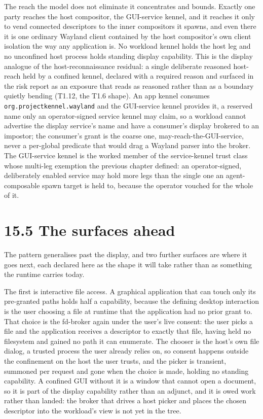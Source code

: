 The reach the model does not eliminate it concentrates and bounds.
Exactly one party reaches the host compositor, the GUI-service kennel,
and it reaches it only to vend connected descriptors to the inner
compositors it spawns, and even there it is one ordinary Wayland client
contained by the host compositor's own client isolation the way any
application is. No workload kennel holds the host leg and no unconfined
host process holds standing display capability. This is the display
analogue of the host-reconnaissance residual: a single deliberate
reasoned host-reach held by a confined kennel, declared with a required
reason and surfaced in the risk report as an exposure that reads as
reasoned rather than as a boundary quietly bending (T1.12, the T1.6
shape). An app kennel consumes \texttt{org.projectkennel.wayland} and
the GUI-service kennel provides it, a reserved name only an
operator-signed service kennel may claim, so a workload cannot advertise
the display service's name and have a consumer's display brokered to an
impostor; the consumer's grant is the coarse one,
may-reach-the-GUI-service, never a per-global predicate that would drag
a Wayland parser into the broker. The GUI-service kennel is the worked
member of the service-kennel trust class whose multi-leg exemption the
previous chapter defined: an operator-signed, deliberately enabled
service may hold more legs than the single one an agent-composable spawn
target is held to, because the operator vouched for the whole of it.

\hypertarget{the-surfaces-ahead}{%
\section{15.5 The surfaces ahead}\label{the-surfaces-ahead}}

The pattern generalises past the display, and two further surfaces are
where it goes next, each declared here as the shape it will take rather
than as something the runtime carries today.

The first is interactive file access. A graphical application that can
touch only its pre-granted paths holds half a capability, because the
defining desktop interaction is the user choosing a file at runtime that
the application had no prior grant to. That choice is the fd-broker
again under the user's live consent: the user picks a file and the
application receives a descriptor to exactly that file, having held no
filesystem and gained no path it can enumerate. The chooser is the
host's own file dialog, a trusted process the user already relies on, so
consent happens outside the confinement on the host the user trusts, and
the picker is transient, summoned per request and gone when the choice
is made, holding no standing capability. A confined GUI without it is a
window that cannot open a document, so it is part of the display
capability rather than an adjunct, and it is owed work rather than
landed: the broker that drives a host picker and places the chosen
descriptor into the workload's view is not yet in the tree.

